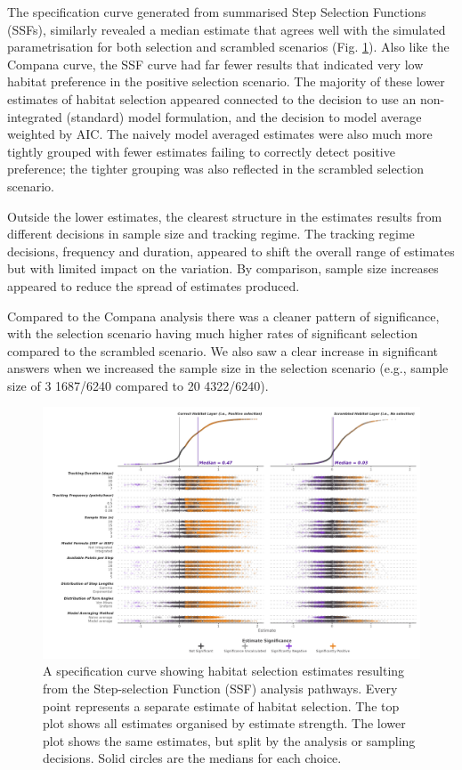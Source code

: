 \documentclass[10pt,a4paper]{article}
\begin{document}
The specification curve generated from summarised Step Selection Functions (SSFs), similarly revealed a median estimate that agrees well with the simulated parametrisation for both selection and scrambled scenarios (Fig. \ref{fig:specCurveSSF}).
Also like the Compana curve, the SSF curve had far fewer results that indicated very low habitat preference in the positive selection scenario.
The majority of these lower estimates of habitat selection appeared connected to the decision to use an non-integrated (standard) model formulation, and the decision to model average weighted by AIC.
The naively model averaged estimates were also much more tightly grouped with fewer estimates failing to correctly detect positive preference; the tighter grouping was also reflected in the scrambled selection scenario.

Outside the lower estimates, the clearest structure in the estimates results from different decisions in sample size and tracking regime.
The tracking regime decisions, frequency and duration, appeared to shift the overall range of estimates but with limited impact on the variation.
By comparison, sample size increases appeared to reduce the spread of estimates produced.

Compared to the Compana analysis there was a cleaner pattern of significance, with the selection scenario having much higher rates of significant selection compared to the scrambled scenario.
We also saw a clear increase in significant answers when we increased the sample size in the selection scenario (e.g., sample size of 3 1687/6240 compared to 20 4322/6240).

\begin{figure}
\includegraphics[width=1\linewidth]{../figures/ssf_specCurve} \caption{A specification curve showing habitat selection estimates resulting from the Step-selection Function (SSF) analysis pathways. Every point represents a separate estimate of habitat selection. The top plot shows all estimates organised by estimate strength. The lower plot shows the same estimates, but split by the analysis or sampling decisions. Solid circles are the medians for each choice.}\label{fig:specCurveSSF}
\end{figure}
\end{document}
